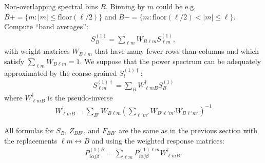\documentclass[twocolumn]{aastex63}
\begin{document}
Non-overlapping spectral bins $B$. Binning by $m$ could be e.g.~$B+ = \lbrace m : |m|\le\text{floor}(\ell/2)\rbrace$ and $B- = \lbrace m : \text{floor}(\ell/2) < |m|\le \ell \rbrace$.  Compute ``band averages'':
\begin{align}
S^{(1)}_B = \sum_{\ell m} W_{B \ell m} S^{(1)}_{\ell m},
\end{align}
with weight matrices $W_{B \ell m}$ that have many fewer rows than columns and which satisfy $\sum_{\ell m} W_{B \ell m} = 1$. We suppose that the power spectrum can be adequately approximated by the coarse-grained $S_l^{(1)\dagger}$:
\begin{align}
S^{(1)\dagger}_{\ell m} = \sum_B W_{\ell m B}^\dagger S_B^{(1)}
\end{align}
where $W_{\ell m B}^\dagger$ is the pseudo-inverse
\begin{align}
W_{\ell m B}^\dagger = \sum_{B'} W_{B \ell m} \left( \sum_{\ell' m'} W_{B' \ell' m'} W_{B \ell' m'} \right)^{-1}
\end{align}

All formulas for $S_B$, $Z_{B B'}$, and $F_{BB'}$ are the same as in the previous section with the replacements $\ell m \leftrightarrow B$ and using the weighted response matrices:
\begin{align}
P^{(1)B}_{i\alpha j \beta} = \sum_{\ell m} P^{(1)\ell m}_{i\alpha j \beta} W^\dagger_{\ell m B}.
\end{align}

% 

% 


\end{document}
